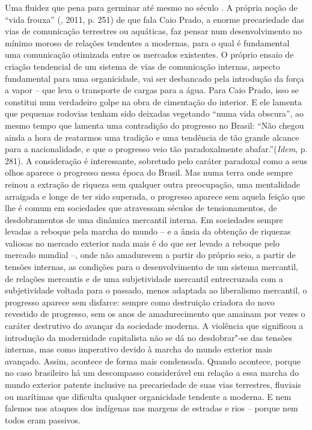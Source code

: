 {Uma fluidez que pena para germinar até mesmo no século . A própria
noção de ``vida frouxa'' (, 2011, p. 251) de que fala Caio Prado,
a enorme precariedade das vias de comunicação terrestres ou aquáticas,
faz pensar num desenvolvimento no mínimo moroso de relações tendentes a
modernas, para o qual é fundamental uma comunicação otimizada entre os
mercados existentes. O próprio ensaio de criação tendencial de um
sistema de vias de comunicação internas, aspecto fundamental para uma
organicidade, vai ser desbancado pela introdução da força a vapor -- que
leva o transporte de cargas para a água. Para Caio Prado, isso se
constitui num verdadeiro golpe na obra de cimentação do interior. E ele
lamenta que pequenas rodovias tenham sido deixadas vegetando ``numa vida
obscura'', ao mesmo tempo que lamenta uma contradição do progresso no
Brasil: ``Não chegou ainda a hora de reatarmos uma tradição e uma
tendência de tão grande alcance para a nacionalidade, e que o progresso
veio tão paradoxalmente abafar.''(\emph{Idem}, p. 281). A consideração é
interessante, sobretudo pelo caráter paradoxal como a seus olhos aparece
o progresso nessa época do Brasil. Mas numa terra onde sempre reinou a
extração de riqueza sem qualquer outra preocupação, uma mentalidade
arraigada e longe de ter sido superada, o progresso aparece sem aquela
feição que lhe é comum em sociedades que atravessam séculos de
tensionamentos, de desdobramentos de uma dinâmica mercantil interna. Em
sociedades sempre levadas a reboque pela marcha do mundo -- e a ânsia da
obtenção de riquezas valiosas no mercado exterior nada mais é do que ser
levado a reboque pelo mercado mundial --, onde não amadurecem a partir
do próprio seio, a partir de tensões internas, as condições para o
desenvolvimento de um sistema mercantil, de relações mercantis e de uma
subjetividade mercantil entrecruzada com a subjetividade voltada para o
passado, menos adaptada ao liberalismo mercantil, o progresso aparece
sem disfarce: sempre como destruição criadora do novo revestido de
progresso, sem os anos de amadurecimento que amainam por vezes o caráter
destrutivo do avançar da sociedade moderna. A violência que significou a
introdução da modernidade capitalista não se dá no desdobrar"-se das
tensões internas, mas como imperativo devido à marcha do mundo exterior
mais avançado. Assim, acontece de forma mais condensada. Quando
acontece, porque no caso brasileiro há um descompasso considerável em
relação a essa marcha do mundo exterior patente inclusive na
precariedade de suas vias terrestres, fluviais ou marítimas que
dificulta qualquer organicidade tendente a moderna. E nem falemos nos
ataques dos indígenas nas margens de estradas e rios -- porque nem todos
eram passivos.

}
